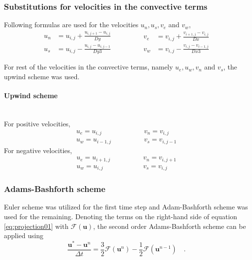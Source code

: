 \documentclass[12pt,a4paper,fleqn]{article}
\begin{document}
\subsubsection{Substitutions for velocities in the convective terms}
Following formulas are used for the velocities $u_n, u_s, v_e$ and $v_w$,
\begin{equation*}
\begin{aligned}
u_n &= u_{i,j} + \frac{u_{i,j+1} - u_{i,j}}{Dy}\\
u_s &= u_{i,j} - \frac{u_{i,j} - u_{i,j-1}}{Dy3}
\end{aligned}
\qquad\qquad
\begin{aligned}
v_e &= v_{i,j} + \frac{v_{i+1,j} - v_{i,j}}{Dx}\\
v_w &= v_{i,j} - \frac{v_{i,j} - v_{i-1,j}}{Dx3}
\end{aligned}
\end{equation*}

For rest of the velocities in the convective terms, namely $u_e, u_w, v_n$ and $v_s$, the upwind scheme was used.

\paragraph{Upwind scheme}\mbox{}\\
For positive velocities,
\begin{equation*}
\begin{aligned}
u_e = u_{i,j}\\
u_w = u_{i-1,j}
\end{aligned}
\qquad\qquad
\begin{aligned}
v_n = v_{i,j}\\
v_s = v_{i,j-1}
\end{aligned}
\end{equation*}
For negative velocities,
\begin{equation*}
\begin{aligned}
u_e = u_{i+1,j}\\
u_w = u_{i,j}
\end{aligned}
\qquad\qquad
\begin{aligned}
v_n = v_{i,j+1}\\
v_s = v_{i,j}
\end{aligned}
\end{equation*}

\subsubsection{Adams-Bashforth scheme}
Euler scheme was utilized for the first time step and Adam-Bashforth scheme was used for the remaining. Denoting the terms on the right-hand side of equation \eqref{eq:projection01} with $\mathcal{F}(\mathbf{u})$, the second order Adams-Bashforth scheme can be applied using
\begin{equation}\label{eq:adams-bashforth}
\frac{\mathbf{u}^*-\mathbf{u}^n}{\Delta t} = \frac{3}{2}\mathcal{F}(\mathbf{u}^n)-\frac{1}{2}\mathcal{F}(\mathbf{u}^{n-1})\quad .
\end{equation}
\end{document}
